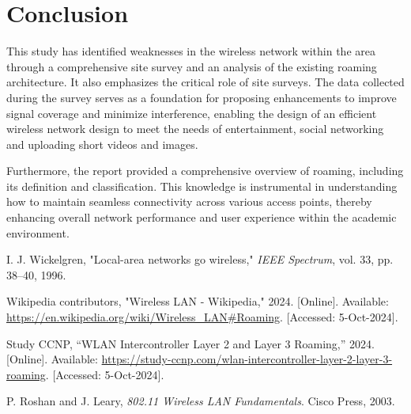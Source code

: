 \documentclass[conference]{IEEEtran}
\begin{document}
\section{Conclusion}

This study has identified weaknesses in the wireless network within the area through a comprehensive site survey and an analysis of the existing roaming architecture. It also emphasizes the critical role of site surveys. The data collected during the survey serves as a foundation for proposing enhancements to improve signal coverage and minimize interference, enabling the design of an efficient wireless network design to meet the needs of entertainment, social networking and uploading short videos and images.

Furthermore, the report provided a comprehensive overview of roaming, including its definition and classification. This knowledge is instrumental in understanding how to maintain seamless connectivity across various access points, thereby enhancing overall network performance and user experience within the academic environment.

\begin{thebibliography}{9}

I. J. Wickelgren, "Local-area networks go wireless," \textit{IEEE Spectrum}, vol. 33, pp. 38--40, 1996.

Wikipedia contributors, "Wireless LAN - Wikipedia," 2024. [Online]. Available: \url{https://en.wikipedia.org/wiki/Wireless_LAN#Roaming}. [Accessed: 5-Oct-2024].

Study CCNP, ``WLAN Intercontroller Layer 2 and Layer 3 Roaming,'' 2024. [Online]. Available: \url{https://study-ccnp.com/wlan-intercontroller-layer-2-layer-3-roaming}. [Accessed: 5-Oct-2024].

P. Roshan and J. Leary, \textit{802.11 Wireless LAN Fundamentals}. Cisco Press, 2003.

\end{thebibliography}
\end{document}
